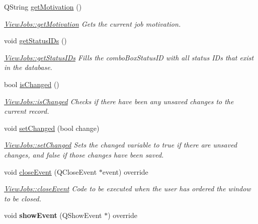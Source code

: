 \begin{DoxyCompactItemize}
Q\+String \mbox{\hyperlink{class_view_jobs_a238ec5365ef2c39baa97670769dfedca}{get\+Motivation}} ()
\begin{DoxyCompactList}\small\item\em \mbox{\hyperlink{class_view_jobs_a238ec5365ef2c39baa97670769dfedca}{View\+Jobs\+::get\+Motivation}} Gets the current job motivation. \end{DoxyCompactList}\item 
\mbox{\label{class_view_jobs_adabe196e81c74d17c436de1a6ea12099}} 
void \mbox{\hyperlink{class_view_jobs_adabe196e81c74d17c436de1a6ea12099}{get\+Status\+I\+Ds}} ()
\begin{DoxyCompactList}\small\item\em \mbox{\hyperlink{class_view_jobs_adabe196e81c74d17c436de1a6ea12099}{View\+Jobs\+::get\+Status\+I\+Ds}} Fills the combo\+Box\+Status\+ID with all status I\+Ds that exist in the database. \end{DoxyCompactList}\item 
bool \mbox{\hyperlink{class_view_jobs_a5f75b45d28ce7f4a8050ce9ce0f44350}{is\+Changed}} ()
\begin{DoxyCompactList}\small\item\em \mbox{\hyperlink{class_view_jobs_a5f75b45d28ce7f4a8050ce9ce0f44350}{View\+Jobs\+::is\+Changed}} Checks if there have been any unsaved changes to the current record. \end{DoxyCompactList}\item 
void \mbox{\hyperlink{class_view_jobs_a3cba868c6deadaf4b35c18982f7ec35e}{set\+Changed}} (bool change)
\begin{DoxyCompactList}\small\item\em \mbox{\hyperlink{class_view_jobs_a3cba868c6deadaf4b35c18982f7ec35e}{View\+Jobs\+::set\+Changed}} Sets the changed variable to true if there are unsaved changes, and false if those changes have been saved. \end{DoxyCompactList}\item 
void \mbox{\hyperlink{class_view_jobs_a832503ca9eb4e4bf79c2fb48a59141aa}{close\+Event}} (Q\+Close\+Event $\ast$event) override
\begin{DoxyCompactList}\small\item\em \mbox{\hyperlink{class_view_jobs_a832503ca9eb4e4bf79c2fb48a59141aa}{View\+Jobs\+::close\+Event}} Code to be executed when the user has ordered the window to be closed. \end{DoxyCompactList}\item 
\mbox{\label{class_view_jobs_a50f3a52f43e097d46e106e0aa31e9eb4}} 
void {\bfseries show\+Event} (Q\+Show\+Event $\ast$) override
\end{DoxyCompactItemize}


